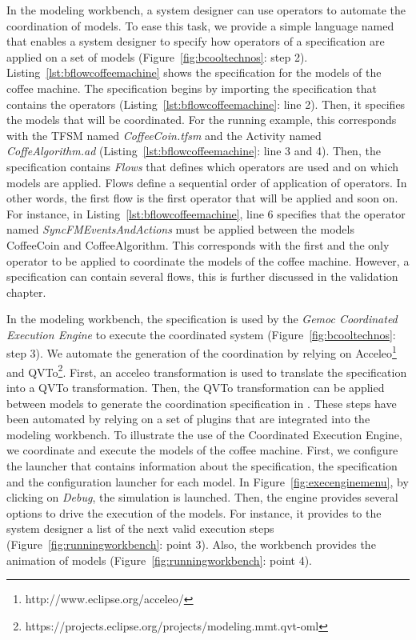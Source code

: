 In the modeling workbench, a system designer can use \bcool operators to automate the coordination of models. To ease this task, we provide a simple language named \bflow that enables a system designer to specify how operators of a \bcool specification are applied on a set of models (Figure~\ref{fig:bcooltechnos}: step 2). Listing~\ref{lst:bflowcoffeemachine} shows the \bflow specification for the models of the coffee machine. The \bflow specification begins by importing the \bcool specification that contains the operators (Listing~\ref{lst:bflowcoffeemachine}: line 2). Then, it specifies the models that will be coordinated. For the running example, this corresponds with the TFSM named \emph{CoffeeCoin.tfsm} and the Activity named \emph{CoffeAlgorithm.ad} (Listing~\ref{lst:bflowcoffeemachine}: line 3 and 4). Then, the specification contains \emph{Flows} that defines which operators are used and on which models are applied. Flows define a sequential order of application of operators. In other words, the first flow is the first operator that will be applied and soon on. For instance, in Listing~\ref{lst:bflowcoffeemachine}, line 6 specifies that the operator named \emph{SyncFMEventsAndActions} must be applied between the models CoffeeCoin and CoffeeAlgorithm. This corresponds with the first and the only operator to be applied to coordinate the models of the coffee machine. However, a \bflow specification can contain several flows, this is further discussed in the validation chapter.  


In the modeling workbench, the \bflow specification is used by the \emph{Gemoc Coordinated Execution Engine} to execute the coordinated system (Figure~\ref{fig:bcooltechnos}: step 3). We automate the generation of the coordination by relying on Acceleo\footnote{http://www.eclipse.org/acceleo/} and QVTo\footnote{https://projects.eclipse.org/projects/modeling.mmt.qvt-oml}. First, an acceleo transformation is used to translate the \bcool specification into a QVTo transformation. Then, the QVTo transformation can be applied between models to generate the coordination specification in \ccsl. These steps have been automated by relying on a set of plugins that are integrated into the modeling workbench. To illustrate the use of the Coordinated Execution Engine, we coordinate and execute the models of the coffee machine. First, we configure the launcher that contains information about the \bcool specification, the \bflow specification and the configuration launcher for each model. In Figure~\ref{fig:execenginemenu}, by clicking on \emph{Debug}, the simulation is launched. Then, the engine provides several options to drive the execution of the models. For instance, it provides to the system designer a list of the next valid execution steps (Figure~\ref{fig:runningworkbench}: point 3). Also, the workbench provides the animation of models (Figure~\ref{fig:runningworkbench}: point 4). 

